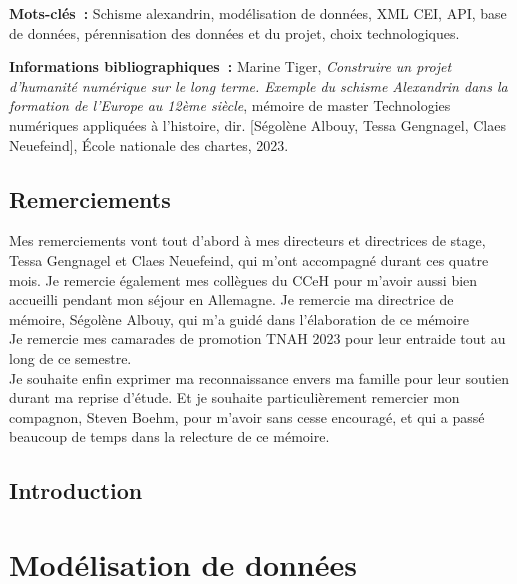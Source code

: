 \documentclass[a4paper,12pt,twoside]{book}
\begin{document}
	\textbf{Mots-clés~:} Schisme alexandrin, modélisation de données, XML CEI, API, base de données, pérennisation des données et du projet, choix technologiques.
	
	\textbf{Informations bibliographiques~:} Marine Tiger, \textit{Construire un projet d'humanité numérique sur le long terme. Exemple du schisme Alexandrin dans la formation de l’Europe au 12ème siècle}, mémoire de master \og{}Technologies numériques appliquées à l'histoire\fg{}, dir. [Ségolène Albouy, Tessa Gengnagel, Claes Neuefeind], École nationale des chartes, 2023.
	
		\newpage{\pagestyle{empty}\cleardoublepage}
	
	\chapter{Remerciements}
	
	Mes remerciements vont tout d'abord à mes directeurs et directrices de stage, Tessa Gengnagel et Claes Neuefeind, qui m'ont accompagné durant ces quatre mois. Je remercie également mes collègues du CCeH pour m'avoir aussi bien accueilli pendant mon séjour en Allemagne. Je remercie ma directrice de mémoire, Ségolène Albouy, qui m'a guidé dans l'élaboration de ce mémoire\\
    Je remercie mes camarades de promotion TNAH 2023 pour leur entraide tout au long de ce semestre.\\
    Je souhaite enfin exprimer ma reconnaissance envers ma famille pour leur soutien durant ma reprise d'étude. Et je souhaite particulièrement remercier mon compagnon, Steven Boehm, pour m'avoir sans cesse encouragé, et qui a passé beaucoup de temps dans la relecture de ce mémoire.
   
	\printbibliography
	
	\chapter{Introduction}
	
	\thispagestyle{empty}
	\cleardoublepage
	
	\mainmatter
	
	
	\part{Modélisation de données}
 
\end{document}
